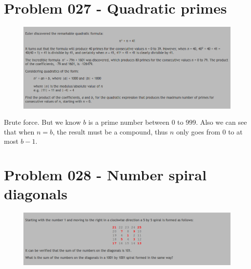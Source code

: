 \section{Problem 027 - Quadratic primes}
\begin{prob}
	\begin{figure}[htb!]
		\begin{center}
			\includegraphics[scale = 0.4]{pic/027.png}
		\end{center}
	\end{figure}
\end{prob}
\begin{sol}
Brute force. But we know $b$ is a prime number between $0$ to $999$. Also we can see that when $n = b$, the result must be a compound, thus $n$ only goes from $0$ to at most $b - 1$.
\end{sol}

\section{Problem 028 - Number spiral diagonals}
\begin{prob}
	\begin{figure}[htb!]
		\begin{center}
			\includegraphics[scale = 0.4]{pic/028.png}
		\end{center}
	\end{figure}
\end{prob}

\begin{sol}

\end{sol}


